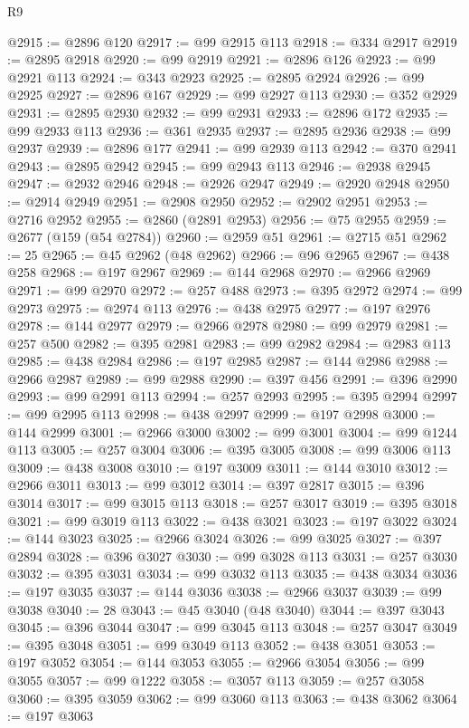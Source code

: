 \begin{lexlean}{R9}
\begin{coremodule}
{{{{{{{{{{{{{{{{{{{{{{{{{{{{{{{{{{{{{{{{{{{{{{{{{{{{{{{{{{{{{{{{{{{{{{{{{{{{{{{{{{{{@2915 := @2896 @120
@2917 := @99 @2915 @113
@2918 := @334 @2917
@2919 := @2895 @2918
@2920 := @99 @2919
@2921 := @2896 @126
@2923 := @99 @2921 @113
@2924 := @343 @2923
@2925 := @2895 @2924
@2926 := @99 @2925
@2927 := @2896 @167
@2929 := @99 @2927 @113
@2930 := @352 @2929
@2931 := @2895 @2930
@2932 := @99 @2931
@2933 := @2896 @172
@2935 := @99 @2933 @113
@2936 := @361 @2935
@2937 := @2895 @2936
@2938 := @99 @2937
@2939 := @2896 @177
@2941 := @99 @2939 @113
@2942 := @370 @2941
@2943 := @2895 @2942
@2945 := @99 @2943 @113
@2946 := @2938 @2945
@2947 := @2932 @2946
@2948 := @2926 @2947
@2949 := @2920 @2948
@2950 := @2914 @2949
@2951 := @2908 @2950
@2952 := @2902 @2951
@2953 := @2716 @2952
@2955 := @2860 (@2891 @2953)
@2956 := @75 @2955
@2959 := @2677 (@159 (@54 @2784))
@2960 := @2959 @51
@2961 := @2715 @51
@2962 := 25
@2965 := @45 @2962 (@48 @2962)
@2966 := @96 @2965
@2967 := @438 @258
@2968 := @197 @2967
@2969 := @144 @2968
@2970 := @2966 @2969
@2971 := @99 @2970
@2972 := @257 @488
@2973 := @395 @2972
@2974 := @99 @2973
@2975 := @2974 @113
@2976 := @438 @2975
@2977 := @197 @2976
@2978 := @144 @2977
@2979 := @2966 @2978
@2980 := @99 @2979
@2981 := @257 @500
@2982 := @395 @2981
@2983 := @99 @2982
@2984 := @2983 @113
@2985 := @438 @2984
@2986 := @197 @2985
@2987 := @144 @2986
@2988 := @2966 @2987
@2989 := @99 @2988
@2990 := @397 @456
@2991 := @396 @2990
@2993 := @99 @2991 @113
@2994 := @257 @2993
@2995 := @395 @2994
@2997 := @99 @2995 @113
@2998 := @438 @2997
@2999 := @197 @2998
@3000 := @144 @2999
@3001 := @2966 @3000
@3002 := @99 @3001
@3004 := @99 @1244 @113
@3005 := @257 @3004
@3006 := @395 @3005
@3008 := @99 @3006 @113
@3009 := @438 @3008
@3010 := @197 @3009
@3011 := @144 @3010
@3012 := @2966 @3011
@3013 := @99 @3012
@3014 := @397 @2817
@3015 := @396 @3014
@3017 := @99 @3015 @113
@3018 := @257 @3017
@3019 := @395 @3018
@3021 := @99 @3019 @113
@3022 := @438 @3021
@3023 := @197 @3022
@3024 := @144 @3023
@3025 := @2966 @3024
@3026 := @99 @3025
@3027 := @397 @2894
@3028 := @396 @3027
@3030 := @99 @3028 @113
@3031 := @257 @3030
@3032 := @395 @3031
@3034 := @99 @3032 @113
@3035 := @438 @3034
@3036 := @197 @3035
@3037 := @144 @3036
@3038 := @2966 @3037
@3039 := @99 @3038
@3040 := 28
@3043 := @45 @3040 (@48 @3040)
@3044 := @397 @3043
@3045 := @396 @3044
@3047 := @99 @3045 @113
@3048 := @257 @3047
@3049 := @395 @3048
@3051 := @99 @3049 @113
@3052 := @438 @3051
@3053 := @197 @3052
@3054 := @144 @3053
@3055 := @2966 @3054
@3056 := @99 @3055
@3057 := @99 @1222
@3058 := @3057 @113
@3059 := @257 @3058
@3060 := @395 @3059
@3062 := @99 @3060 @113
@3063 := @438 @3062
@3064 := @197 @3063
}}}}}}}}}}}}}}}}}}}}}}}}}}}}}}}}}}}}}}}}}}}}}}}}}}}}}}}}}}}}}}}}}}}}}}}}}}}}}}}}}}}}
\end{coremodule}
\end{lexlean}
